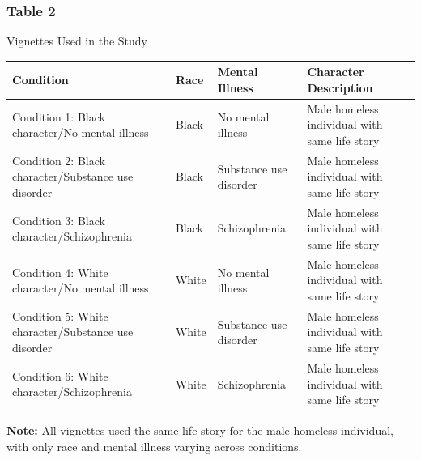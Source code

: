 \documentclass[
  man,
  floatsintext,
  longtable,
  nolmodern,
  notxfonts,
  notimes,
  colorlinks=true,linkcolor=blue,citecolor=blue,urlcolor=blue]{apa7}
\begin{document}
\subsubsection{Table 2}\label{table-2}

Vignettes Used in the Study

\begin{longtable}[]{@{}
  >{\raggedright\arraybackslash}p{}
  >{\raggedright\arraybackslash}p{}
  >{\raggedright\arraybackslash}p{}
  >{\raggedright\arraybackslash}p{}@{}}
\toprule\noalign{}
\begin{minipage}[b]{\linewidth}\raggedright
\textbf{Condition}
\end{minipage} & \begin{minipage}[b]{\linewidth}\raggedright
\textbf{Race}
\end{minipage} & \begin{minipage}[b]{\linewidth}\raggedright
\textbf{Mental Illness}
\end{minipage} & \begin{minipage}[b]{\linewidth}\raggedright
\textbf{Character Description}
\end{minipage} \\
\midrule\noalign{}
\endhead
\bottomrule\noalign{}
\endlastfoot
Condition 1: Black character/No mental illness & Black & No mental
illness & Male homeless individual with same life story \\
Condition 2: Black character/Substance use disorder & Black & Substance
use disorder & Male homeless individual with same life story \\
Condition 3: Black character/Schizophrenia & Black & Schizophrenia &
Male homeless individual with same life story \\
Condition 4: White character/No mental illness & White & No mental
illness & Male homeless individual with same life story \\
Condition 5: White character/Substance use disorder & White & Substance
use disorder & Male homeless individual with same life story \\
Condition 6: White character/Schizophrenia & White & Schizophrenia &
Male homeless individual with same life story \\
\end{longtable}

\textbf{Note:} All vignettes used the same life story for the male
homeless individual, with only race and mental illness varying across
conditions.
\end{document}
